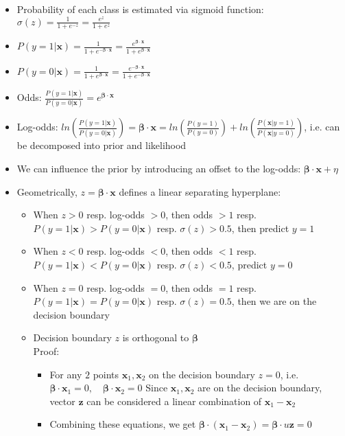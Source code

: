 \begin{itemize}
    \item Probability of each class is estimated via sigmoid function: $\sigma(z) = \frac{1}{1+e^{-z}} = \frac{e^{z}}{1+e^{z}}$
    \item $P(y=1|\boldsymbol{x}) = \frac{1}{1+e^{-\boldsymbol{\beta} \cdot \boldsymbol{x}}} = \frac{e^{\boldsymbol{\beta} \cdot \boldsymbol{x}}}{1+e^{\boldsymbol{\beta} \cdot \boldsymbol{x}}}$
    \item $P(y=0|\boldsymbol{x}) = \frac{1}{1+e^{\boldsymbol{\beta} \cdot \boldsymbol{x}}} = \frac{e^{-\boldsymbol{\beta} \cdot \boldsymbol{x}}}{1+e^{-\boldsymbol{\beta} \cdot \boldsymbol{x}}}$
    \item Odds: $\frac{P(y=1|\boldsymbol{x})}{P(y=0|\boldsymbol{x})} = e^{\boldsymbol{\beta} \cdot \boldsymbol{x}}$
    \item Log-odds: $ln(\frac{P(y=1|\boldsymbol{x})}{P(y=0|\boldsymbol{x})}) = \boldsymbol{\beta} \cdot \boldsymbol{x} = ln(\frac{P(y=1)}{P(y=0)}) + ln(\frac{P(\boldsymbol{x}|y=1)}{P(\boldsymbol{x}|y=0)})$, i.e. can be decomposed into prior and likelihood
    \item We can influence the prior by introducing an offset to the log-odds: $\boldsymbol{\beta} \cdot \boldsymbol{x} + \eta$
    \item Geometrically, $z = \boldsymbol{\beta} \cdot \boldsymbol{x}$ defines a linear separating hyperplane:
    \begin{itemize}
        \item When $z > 0$ resp. log-odds $> 0$, then odds $> 1$ resp. $P(y=1|\boldsymbol{x}) > P(y=0|\boldsymbol{x})$ resp. $\sigma(z) > 0.5$, then predict $y = 1$
        \item When $z < 0$ resp. log-odds $< 0$, then odds $< 1$ resp. $P(y=1|\boldsymbol{x}) < P(y=0|\boldsymbol{x})$ resp. $\sigma(z) < 0.5$, predict $y = 0$
        \item When $z = 0$ resp. log-odds $= 0$, then odds $= 1$ resp. $P(y=1|\boldsymbol{x}) = P(y=0|\boldsymbol{x})$ resp. $\sigma(z) = 0.5$, then we are on the decision boundary
        \item Decision boundary $z$ is orthogonal to $\boldsymbol{\beta}$\\
        Proof:
        \begin{itemize}
            \item For any $2$ points $\boldsymbol{x}_1,\boldsymbol{x}_2$ on the decision boundary $z = 0$, i.e. $\boldsymbol{\beta} \cdot \boldsymbol{x}_1 =0, \quad \boldsymbol{\beta} \cdot \boldsymbol{x}_2 =0$ 
            \iem Since $\boldsymbol{x}_1,\boldsymbol{x}_2$ are on the decision boundary, vector $\boldsymbol{z}$ can be considered a linear combination of $\boldsymbol{x}_1 - \boldsymbol{x}_2$
            \item Combining these equations, we get $\boldsymbol{\beta} \cdot (\boldsymbol{x}_1 - \boldsymbol{x}_2) =\boldsymbol{\beta} \cdot u \boldsymbol{z}=0$
        \end{itemize}
    \end{itemize}
\end{itemize}

